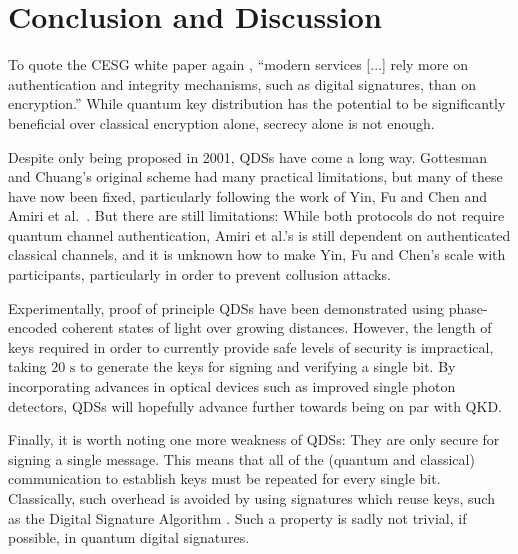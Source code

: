 \documentclass[%
 reprint,
 amsmath,amssymb,
 aps,
 pra,
]{revtex4-1}
\begin{document}
\section{Conclusion and Discussion}
\label{sec:conclusion}

To quote the CESG white paper again \cite{CESG16}, ``modern services [...] rely more on authentication and integrity mechanisms, such as digital signatures, than on encryption.'' While quantum key distribution has the potential to be significantly beneficial over classical encryption alone, secrecy alone is not enough.

Despite only being proposed in 2001, QDSs have come a long way. Gottesman and Chuang's original scheme \cite{quant-ph/0105032} had many practical limitations, but many of these have now been fixed, particularly following the work of Yin, Fu and Chen \cite{PhysRevA.93.032316} and Amiri et al.\ \cite{PhysRevA.93.032325}. But there are still limitations: While both protocols do not require quantum channel authentication, Amiri et al.'s is still dependent on authenticated classical channels, and it is unknown how to make Yin, Fu and Chen's scale with participants, particularly in order to prevent collusion attacks.

Experimentally, proof of principle QDSs have been demonstrated using phase-encoded coherent states of light over growing distances. However, the length of keys required in order to currently provide safe levels of security is impractical, taking $20\text{ s}$ to generate the keys for signing and verifying a single bit. By incorporating advances in optical devices such as improved single photon detectors, QDSs will hopefully advance further towards being on par with QKD.

Finally, it is worth noting one more weakness of QDSs: They are only secure for signing a single message. This means that all of the (quantum and classical) communication to establish keys must be repeated for every single bit. Classically, such overhead is avoided by using signatures which reuse keys, such as the Digital Signature Algorithm \cite{kravitz1993digital}. Such a property is sadly not trivial, if possible, in quantum digital signatures.


\appendix
\end{document}
